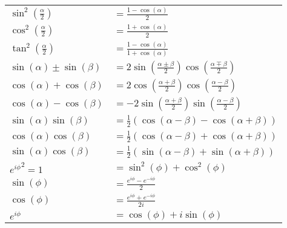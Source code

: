 \documentclass[a4paper,10pt]{scrartcl}
\begin{document}
\begin{multicols}{2}
	\columnbreak
	\hspace{-25pt}
	\begin{tabular}{l l}
		$ \sin^2(\frac{\alpha}{2}) $  &  $ = \frac{1-\cos(\alpha)}{2} $ \\
		$ \cos^2(\frac{\alpha}{2}) $  &  $ = \frac{1+\cos(\alpha)}{2} $ \\
		$ \tan^2(\frac{\alpha}{2}) $  &  $ = \frac{1-\cos(\alpha)}{1+\cos(\alpha)} $ \\
		$ \sin(\alpha) \pm \sin(\beta) $  &  $ = 2 \sin(\frac{\alpha \pm \beta}{2}) \cos(\frac{\alpha \mp \beta}{2}) $ \\
		$ \cos(\alpha) + \cos(\beta) $  &  $ = 2 \cos(\frac{\alpha + \beta}{2}) \cos(\frac{\alpha - \beta}{2}) $ \\
		$ \cos(\alpha) - \cos(\beta) $  &  $ = - 2 \sin(\frac{\alpha + \beta}{2}) \sin(\frac{\alpha - \beta}{2}) $ \\
		$ \sin(\alpha)\sin(\beta) $  &  $ = \scriptstyle \frac{1}{2} \left( \cos(\alpha - \beta) - \cos(\alpha + \beta) \right) $ \\
		$ \cos(\alpha)\cos(\beta) $  &  $ = \scriptstyle \frac{1}{2} \left( \cos(\alpha - \beta) + \cos(\alpha + \beta) \right) $ \\
		$ \sin(\alpha)\cos(\beta) $  &  $ = \scriptstyle \frac{1}{2} \left( \sin(\alpha - \beta) + \sin(\alpha + \beta) \right) $ \\
		$ {e^{i\phi}}^2 = 1 $  & $ = \sin^2(\phi)+\cos^2(\phi) $ \\
		$ \sin(\phi) $  &  $ = \frac{e^{i \phi}-e^{-i\phi}}{2} $ \\
		$ \cos(\phi) $  &  $ = \frac{e^{i \phi}+e^{-i\phi}}{2i} $ \\
		$ e^{i\phi} $  &  $ = \cos(\phi)+i \sin(\phi) $ 
	\end{tabular}
\end{multicols}
\end{document}
